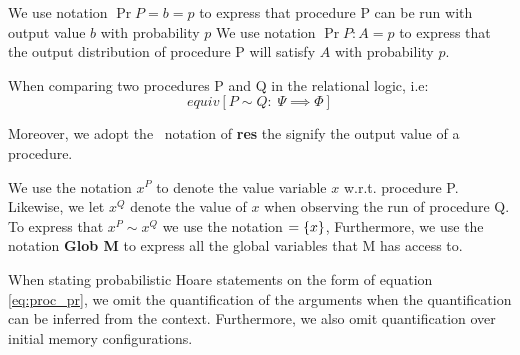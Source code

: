 We use notation $\Pr{P = b} = p$ to express that procedure P can be run with
output value $b$ with probability $p$
We use notation $\Pr{P : A} = p$ to express that the output distribution of
procedure P will satisfy $A$ with probability $p$.

When comparing two procedures P and Q in the relational logic, i.e:
\[
  equiv[P \sim Q :\; \Psi \implies \Phi]
\]

Moreover, we adopt the \easycrypt\ notation of \textbf{res} the signify the
output value of a procedure.

We use the notation $x^{P}$ to denote the value variable $x$ w.r.t. procedure P.
Likewise, we let $x^{Q}$ denote the value of $x$ when observing the run of
procedure Q. To express that $x^{P} \sim x^{Q}$ we use the notation $=\{x\}$,
Furthermore, we use the notation \textbf{Glob M} to express all the global
variables that M has access to.

When stating probabilistic Hoare statements on the form of equation
\ref{eq:proc_pr}, we omit the quantification of the arguments when the
quantification can be inferred from the context. Furthermore, we also omit
quantification over initial memory configurations.

